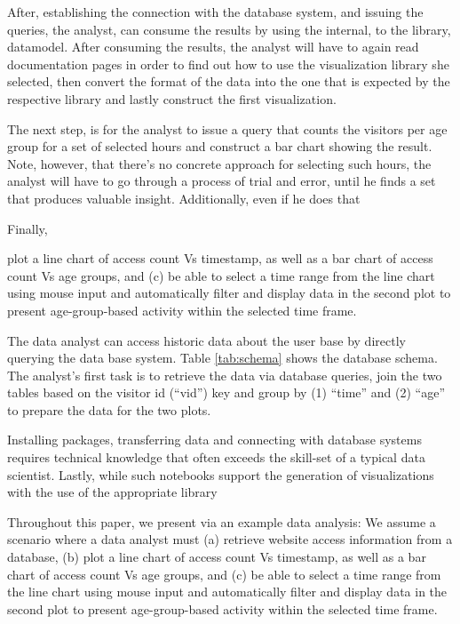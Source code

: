 After, establishing the connection with the database system, and issuing the queries, the analyst, can consume the results by using the internal, to the library, datamodel. After consuming the results, the analyst will have to again read documentation pages in order to find out how to use the visualization library she selected, then convert the format of the data into the one that is expected by the respective library and lastly construct the first visualization.

The next step, is for the analyst to issue a query that counts the visitors per age group for a set of selected hours and construct a bar chart showing the result. Note, however, that there's no concrete approach for selecting such hours, the analyst will have to go through a process of trial and error, until he finds a set that produces valuable insight. Additionally, even if he does that


Finally, 


plot a line chart of access count Vs timestamp, as well as a bar chart of access count Vs age groups, and (c) be able to select a time range from the line chart using mouse input and automatically filter and display data in the second plot to present age-group-based activity within the selected time frame. 


The data analyst can access historic data about the user base by directly querying the data base system. Table \ref{tab:schema} shows the database schema. The analyst's first task is to retrieve the data via database queries, join the two tables based on the visitor id (``vid'') key and group by (1) ``time'' and (2) ``age'' to prepare the data for the two plots.

Installing packages, transferring data and connecting with database systems requires technical knowledge that often exceeds the skill-set of a typical data scientist. Lastly, while such notebooks support the generation of visualizations with the use of the appropriate library



Throughout this paper, we present {\projname} via an example data analysis: We assume a scenario where a data analyst must (a) retrieve  website access information from a database, (b) plot a line chart of access count Vs timestamp, as well as a bar chart of access count Vs age groups, and (c) be able to select a time range from the line chart using mouse input and automatically filter and display data in the second plot to present age-group-based activity within the selected time frame. 

